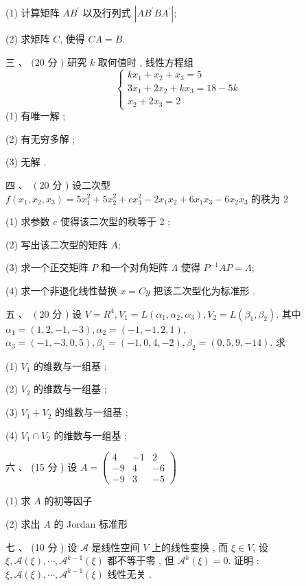 \documentclass[10pt]{article}
\begin{document}
{(1)  计算矩阵  $A B^{\prime}$  以及行列式  $\left|A B^{\prime} B A^{\prime}\right|$;

(2)  求矩阵  $C$,  使得  $C A=B$.

 三 、 $(20$  分  $)$  研究  $k$  取何值时 ,  线性方程组 
$$
\left\{\begin{array}{l}
k x_{1}+x_{2}+x_{3}=5 \\
3 x_{1}+2 x_{2}+k x_{3}=18-5 k \\
x_{2}+2 x_{3}=2
\end{array}\right.
$$
(1)  有唯一解 ;

(2)  有无穷多解 ;

(3)  无解 .

 四 、 $\left(20\right.$  分 )  设二次型  $f\left(x_{1}, x_{2}, x_{3}\right)=5 x_{1}^{2}+5 x_{2}^{2}+c x_{3}^{2}-2 x_{1} x_{2}+6 x_{1} x_{3}-6 x_{2} x_{3}$  的秩为  2

(1)  求参数  $c$  使得该二次型的秩等于  2 ;

(2)  写出该二次型的矩阵  $A$;

(3)  求一个正交矩阵  $P$  和一个对角矩阵  $\Lambda$  使得  $P^{-1} A P=\Lambda$;

(4)  求一个非退化线性替换  $x=C y$  把该二次型化为标准形 .

 五 、 $\left(20\right.$  分 )  设  $V=R^{4}, V_{1}=L\left(\alpha_{1}, \alpha_{2}, \alpha_{3}\right), V_{2}=L\left(\beta_{1}, \beta_{2}\right)$.  其中  $\alpha_{1}=(1,2,-1,-3), \alpha_{2}=(-1,-1,2,1)$, $\alpha_{3}=(-1,-3,0,5), \beta_{1}=(-1,0,4,-2), \beta_{2}=(0,5,9,-14)$.  求 

(1) $V_{1}$  的维数与一组基 ;

(2) $V_{2}$  的维数与一组基 ;

(3) $V_{1}+V_{2}$  的维数与一组基 ;

(4) $V_{1} \cap V_{2}$  的维数与一组基 ;

 六 、 (15  分 )  设  $A=\left(\begin{array}{ccc}4 & -1 & 2 \\ -9 & 4 & -6 \\ -9 & 3 & -5\end{array}\right)$

(1)  求  $A$  的初等因子 

(2)  求出  $A$  的  Jordan  标准形 

 七 、 (10  分 )  设  $\mathscr{A}$  是线性空间  $V$  上的线性变换 ,  而  $\xi \in V$,  设  $\xi, \mathscr{A}(\xi), \cdots, \mathscr{A}^{k-1}(\xi)$  都不等于零 ,  但  $\mathscr{A}^{k}(\xi)=0$.  证明 : $\xi, \mathscr{A}(\xi), \cdots, \mathscr{A}^{k-1}(\xi)$  线性无关 .

}
\end{document}
